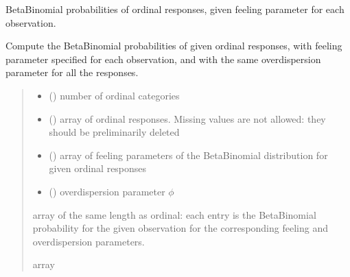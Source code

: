 \documentclass[letterpaper,10pt,english]{sphinxmanual}
\begin{document}

\begin{fulllineitems}
\label{\detokenize{cubmods:cubmods.cube_0w0.betabinomialxi}}
\pysigstartsignatures
{}
\pysigstopsignatures
\sphinxAtStartPar
Beta\sphinxhyphen{}Binomial probabilities of ordinal responses, given feeling parameter for each observation.

\sphinxAtStartPar
Compute the Beta\sphinxhyphen{}Binomial probabilities of given ordinal responses, with feeling 
parameter specified for each observation, 
and with the same overdispersion parameter for all the responses.
\begin{quote}\begin{description}
\begin{itemize}
\item {} 
\sphinxAtStartPar
{} () \textendash{} number of ordinal categories

\item {} 
\sphinxAtStartPar
{} () \textendash{} array of ordinal responses. Missing values are not allowed: they should be preliminarily deleted

\item {} 
\sphinxAtStartPar
{} () \textendash{} array of feeling parameters of the Beta\sphinxhyphen{}Binomial distribution for given ordinal responses

\item {} 
\sphinxAtStartPar
{} () \textendash{} overdispersion parameter \(\phi\)

\end{itemize}

\sphinxAtStartPar
array of the same length as ordinal: each entry is the Beta\sphinxhyphen{}Binomial probability for the given observation 
for the corresponding feeling and overdispersion parameters.

\sphinxAtStartPar
array

\end{description}\end{quote}

\end{fulllineitems}
\end{document}
